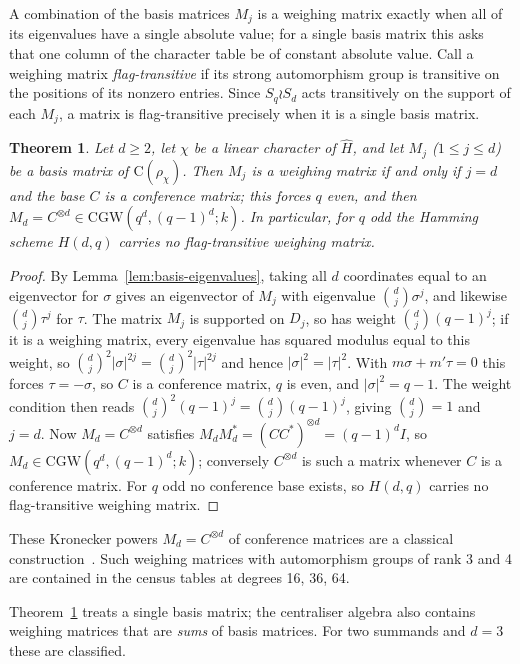 \documentclass{article}
\newtheorem{theorem}{Theorem}[section]
\theoremstyle{definition}
\theoremstyle{remark}
\newcommand{\Cr}{\mathrm{C}}
\newcommand{\CGW}{\mathrm{CGW}}
\begin{document}
A combination of the basis matrices $M_j$ is a weighing matrix exactly when all
of its eigenvalues have a single absolute value; for a single basis matrix this
asks that one column of the character table be of constant absolute value.  Call
a weighing matrix \emph{flag-transitive} if its strong automorphism group is
transitive on the positions of its nonzero entries.  Since $S_q\wr S_d$ acts
transitively on the support of each $M_j$, a matrix is flag-transitive precisely
when it is a single basis matrix.

\begin{theorem}\label{thm:hamming-flag}
Let $d\geq2$, let $\chi$ be a linear character of $\widehat H$, and let $M_j$
($1\leq j\leq d$) be a basis matrix of $\Cr(\rho_\chi)$.  Then $M_j$ is a weighing
matrix if and only if $j=d$ and the base $C$ is a conference matrix; this forces
$q$ even, and then $M_d=C^{\otimes d}\in\CGW(q^d,(q-1)^d;k)$.  In particular, for
$q$ odd the Hamming scheme $H(d,q)$ carries no flag-transitive weighing matrix.
\end{theorem}

\begin{proof}
By Lemma~\ref{lem:basis-eigenvalues}, taking all $d$ coordinates equal to an
eigenvector for $\sigma$ gives an eigenvector of $M_j$ with eigenvalue
$\binom{d}{j}\sigma^{j}$, and likewise $\binom{d}{j}\tau^{j}$ for $\tau$.  The
matrix $M_j$ is supported on $D_j$, so has weight $\binom{d}{j}(q-1)^j$; if it is
a weighing matrix, every eigenvalue has squared modulus equal to this weight, so
$\binom{d}{j}^2|\sigma|^{2j}=\binom{d}{j}^2|\tau|^{2j}$ and hence
$|\sigma|^2=|\tau|^2$.  With $m\sigma+m'\tau=0$ this forces $\tau=-\sigma$, so $C$
is a conference matrix, $q$ is even, and $|\sigma|^2=q-1$.  The weight condition
then reads $\binom{d}{j}^2(q-1)^{j}=\binom{d}{j}(q-1)^{j}$, giving $\binom{d}{j}=1$
and $j=d$.  Now $M_d=C^{\otimes d}$ satisfies
$M_dM_d^{*}=(CC^{*})^{\otimes d}=(q-1)^dI$, so $M_d\in\CGW(q^d,(q-1)^d;k)$;
conversely $C^{\otimes d}$ is such a matrix whenever $C$ is a conference matrix.
For $q$ odd no conference base exists, so $H(d,q)$ carries no flag-transitive 
weighing matrix.
\end{proof}

These Kronecker powers $M_d=C^{\otimes d}$ of conference matrices are a classical construction~\cite{GeramitaSeberry1979}. Such weighing matrices with automorphism groups of rank 3 and 4 are contained in the census tables at degrees 16, 36, 64. 

Theorem~\ref{thm:hamming-flag} treats a single basis matrix; the centraliser
algebra also contains weighing matrices that are \emph{sums} of basis matrices.
For two summands and $d=3$ these are classified.
\end{document}
